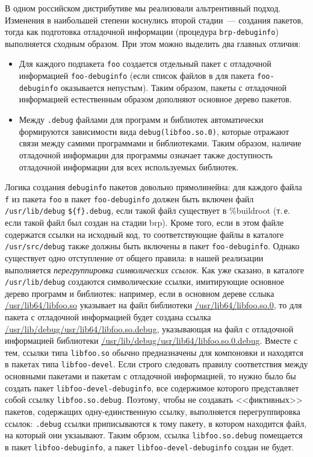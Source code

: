 \documentclass[russian,a4paper,12pt,titlepage]{article}
\begin{document}
В одном российском дистрибутиве мы реализовали альтрентивный подход.  Изменения в наибольшей степени коснулись второй стадии~---
создания пакетов, тогда как подготовка отладочной информации (процедура \verb|brp-debuginfo|) выполняется сходным образом.
При этом можно выделить два главных отличия:
\begin{itemize}
\item Для каждого подпакета \verb|foo| создается отдельный пакет с отладочной информацией \verb|foo-debuginfo| (если список
файлов в для пакета \verb|foo-debuginfo| оказывается непустым).  Таким образом, пакеты с отладочной информацией естественным
образом дополняют основное дерево пакетов.
\item Между \verb|.debug| файлами для программ и библиотек автоматически формируются зависимости вида \verb|debug(libfoo.so.0)|,
которые отражают связи между самими программами и библиотеками.  Таким образом, наличие отладочной информации для программы означает
также доступность отладочной информации для всех используемых библиотек.
\end{itemize}

Логика создания \verb|debuginfo| пакетов довольно прямолинейна: для каждого файла \verb|f| из пакета \verb|foo|
в пакет \verb|foo-debuginfo| должен быть включен файл \verb|/usr/lib/debug| \verb|${f}.debug|,
если такой файл существует в \%buildroot (т.\,е. если такой файл был создан на стадии brp).
Кроме того, если в этом файле содержатся ссылки на исходный код, то соответствующие файлы в каталоге
\verb|/usr/src/debug| также должны быть включены в пакет \verb|foo-debuginfo|.  Однако существует
одно отступление от общего правила: в нашей реализации выполняется \emph{перегруппировка символических ссылок}.
Как уже сказано, в каталоге \verb|/usr/lib/debug| создаются символические ссылки, имитирующие основное дерево
программ и библиотек: например, если в основном дереве сслыка \url{/usr/lib64/libfoo.so} указывает на файл
библиотеки \url{/usr/lib64/libfoo.so.0}, то для пакета с отладочной информацией будет создана ссылка
\url{/usr/lib/debug/usr/lib64/libfoo.so.debug}, указывающая на файл с отладочной информацией библиотеки
\url{/usr/lib/debug/usr/lib64/libfoo.so.0.debug}.  Вместе с тем, ссылки типа \verb|libfoo.so| обычно
предназначены для компоновки и находятся в пакетах типа \verb|libfoo-devel|.  Если строго следовать
правилу соответствия между основными пакетами и пакетам с отладочной информацией, то нужно было бы создать
пакет \verb|libfoo-devel-debuginfo|, все содержимое которого представляет собой ссылку \verb|libfoo.so.debug|.
Поэтому, чтобы не создавать <<фиктивных>> пакетов, содержащих одну-единственную
ссылку, выполняется перегруппировка ссылок: \verb|.debug| ссылки приписываются к тому пакету, в котором
находится файл, на который они укзаывают.  Таким обрзом, ссылка \verb|libfoo.so.debug| помещается в пакет
\verb|libfoo-debuginfo|, а пакет \verb|libfoo-devel-debuginfo| создан не будет.
\end{document}
